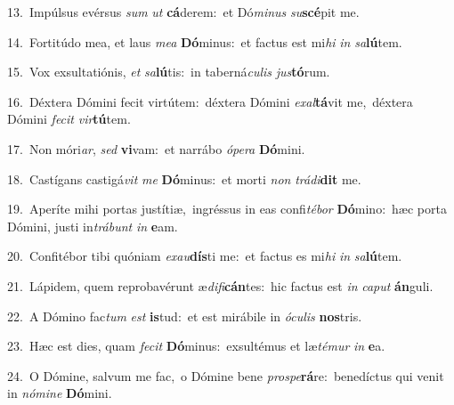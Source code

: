 {\numbfont\textcolor{\numbcolor}{13.}}~Impúlsus evérsus \textit{sum} \textit{ut} \textbf{cá}\-derem:~\star et Dó\-\textit{mi}\-\textit{nus} \textit{su}\-\textbf{scé}pit me.\par
{\numbfont\textcolor{\numbcolor}{14.}}~Fortitúdo mea, et laus \textit{me}\-\textit{a} \textbf{Dó}\-minus:~\star et factus est mi\textit{hi} \textit{in} \textit{sa}\-\textbf{lú}tem.\par
{\numbfont\textcolor{\numbcolor}{15.}}~Vox exsultatiónis, \textit{et} \textit{sa}\-\textbf{lú}tis:~\star in taberná\-\textit{cu}\-\textit{lis} \textit{jus}\-\textbf{tó}rum.\par
{\numbfont\textcolor{\numbcolor}{16.}}~Déxtera Dómini fecit virtútem:~\dagger déxtera Dómini \textit{ex}\-\textit{al}\textbf{tá}vit me,~\star déxtera Dómini \textit{fe}\-\textit{cit} \textit{vir}\-\textbf{tú}tem.\par
{\numbfont\textcolor{\numbcolor}{17.}}~Non móri\-\textit{ar}\-, \textit{sed} \textbf{vi}\-vam:~\star et narrábo \textit{ó}\-\textit{pe}\textit{ra} \textbf{Dó}\-mini.\par
{\numbfont\textcolor{\numbcolor}{18.}}~Castígans castigá\textit{vit} \textit{me} \textbf{Dó}\-minus:~\star et morti \textit{non} \textit{trá}\-\textit{di}\textbf{dit} me.\par
{\numbfont\textcolor{\numbcolor}{19.}}~Aperíte mihi portas justítiæ,~\dagger ingréssus in eas confi\-\textit{té}\-\textit{bor} \textbf{Dó}\-mino:~\star hæc porta Dómini, justi in\-\textit{trá}\-\textit{bunt} \textit{in} \textbf{e}\-am.\par
{\numbfont\textcolor{\numbcolor}{20.}}~Confitébor tibi quóniam \textit{ex}\-\textit{au}\textbf{dís}ti me:~\star et factus es mi\textit{hi} \textit{in} \textit{sa}\-\textbf{lú}tem.\par
{\numbfont\textcolor{\numbcolor}{21.}}~Lápidem, quem reprobavérunt æ\-\textit{di}\-\textit{fi}\textbf{cán}tes:~\star hic factus est \textit{in} \textit{ca}\-\textit{put} \textbf{án}\-guli.\par
{\numbfont\textcolor{\numbcolor}{22.}}~A Dómino fac\textit{tum} \textit{est} \textbf{is}\-tud:~\star et est mirábile in \textit{ó}\-\textit{cu}\textit{lis} \textbf{nos}\-tris.\par
{\numbfont\textcolor{\numbcolor}{23.}}~Hæc est dies, quam \textit{fe}\-\textit{cit} \textbf{Dó}\-minus:~\star exsultémus et læ\-\textit{té}\-\textit{mur} \textit{in} \textbf{e}\-a.\par
{\numbfont\textcolor{\numbcolor}{24.}}~O Dómine, salvum me fac,~\dagger o Dómine bene \textit{pro}\-\textit{spe}\textbf{rá}re:~\star benedíctus qui venit in \textit{nó}\-\textit{mi}\textit{ne} \textbf{Dó}\-mini.\par
